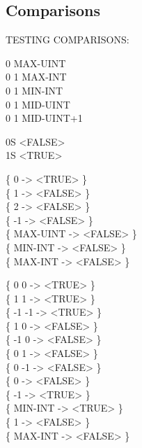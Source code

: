 \subsection{Comparisons}

\begin{tt}
TESTING COMPARISONS:  \word{=}      

0  				\tab[7.9]		 MAX-UINT \\
0  1  \tab[3.15]		 MAX-INT \\
0  1  	 MIN-INT \\
0  1  \tab[3.15]		 MID-UINT \\
0  1  	 MID-UINT+1

0S  <FALSE> \\
1S  <TRUE>

\{  0  -> <TRUE>  \} \\
\{  1  -> <FALSE> \} \\
\{  2  -> <FALSE> \} \\
\{ -1  -> <FALSE> \} \\
\{ MAX-UINT  -> <FALSE> \} \\
\{ MIN-INT   -> <FALSE> \} \\
\{ MAX-INT   -> <FALSE> \}

\{  0  0 \word{=} -> <TRUE>  \} \\
\{  1  1 \word{=} -> <TRUE>  \} \\
\{ -1 -1 \word{=} -> <TRUE>  \} \\
\{  1  0 \word{=} -> <FALSE> \} \\
\{ -1  0 \word{=} -> <FALSE> \} \\
\{  0  1 \word{=} -> <FALSE> \} \\
\{  0 -1 \word{=} -> <FALSE> \} \\

\{       0  -> <FALSE> \} \\
\{      -1  -> <TRUE>  \} \\
\{ MIN-INT  -> <TRUE>  \} \\
\{       1  -> <FALSE> \} \\
\{ MAX-INT  -> <FALSE> \}


\end{tt}
